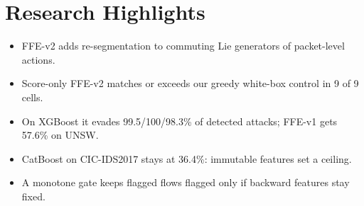 \documentclass[12pt]{article}
\begin{document}
\section*{Research Highlights}
\begin{itemize}
    \item FFE-v2 adds re-segmentation to commuting Lie generators of packet-level actions.
    \item Score-only FFE-v2 matches or exceeds our greedy white-box control in 9 of 9 cells.
    \item On XGBoost it evades 99.5/100/98.3\% of detected attacks; FFE-v1 gets 57.6\% on UNSW.
    \item CatBoost on CIC-IDS2017 stays at 36.4\%: immutable features set a ceiling.
    \item A monotone gate keeps flagged flows flagged only if backward features stay fixed.
\end{itemize}
\end{document}
